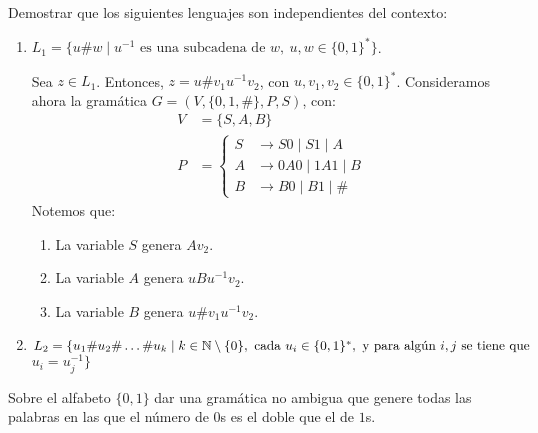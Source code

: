 \begin{ejercicio}\label{ej:1.4.16}
    Demostrar que los siguientes lenguajes son independientes del contexto:
    \begin{enumerate}
        \item $L_1 = \{ u \# w \mid u^{-1} \text{ es una subcadena de } w,~u, w \in \{ 0, 1 \}^* \}$.
        
        Sea $z\in L_1$. Entonces, $z=u\#v_1u^{-1}v_2$, con $u,v_1,v_2\in \{0,1\}^*$. Consideramos ahora la gramática $G=(V,\{0,1,\#\},P,S)$, con:
        \begin{equation*}
            \begin{aligned}
                V &= \{ S, A, B\} \\
                P &= \left\{
                    \begin{aligned}
                        S &\rightarrow S0 \mid S1\mid A \\
                        A & \rightarrow 0A0 \mid 1A1 \mid B \\
                        B &\rightarrow B0 \mid B1 \mid \#
                    \end{aligned}
                \right.
            \end{aligned}
        \end{equation*}
        Notemos que:
        \begin{enumerate}
            \item La variable $S$ genera $Av_2$.
            \item La variable $A$ genera $uBu^{-1}v_2$.
            \item La variable $B$ genera $u\#v_1u^{-1}v_2$.
        \end{enumerate}
        
        \item $L_2 = \{ u_1 \# u_2 \# \ldots \# u_k \mid k\in \mathbb{N}\setminus \{0\}, \text{ cada } u_i \in \{ 0, 1 \}^*, \text{ y para algún } i,j \text{ se tiene que }$ $u_i=u_j^{-1} \}$
        
    \end{enumerate}
\end{ejercicio}

\begin{ejercicio}\label{ej:1.4.17}
    Sobre el alfabeto $\{ 0, 1 \}$ dar una gramática no ambigua que genere todas las palabras en las que el número de $0$s es el doble que el de $1$s.
\end{ejercicio}

